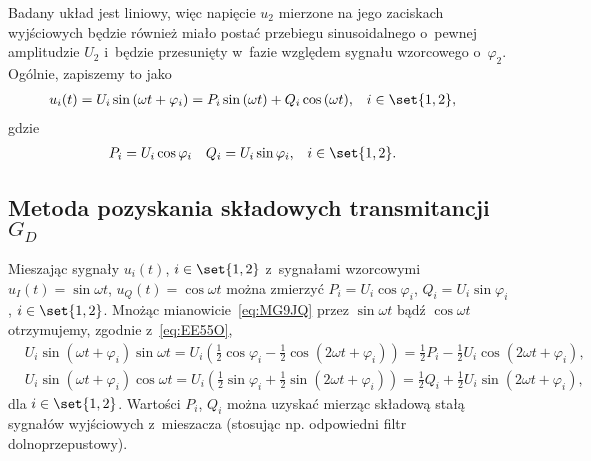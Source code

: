 \documentclass[paper=a4,DIV=12]{tfa}
\begin{document}
Badany układ jest liniowy, więc napięcie $u_2$ mierzone na
jego zaciskach wyjściowych będzie również miało postać przebiegu sinusoidalnego
o~pewnej amplitudzie $U_2$ i~będzie przesunięty w~fazie względem sygnału
wzorcowego o~$\varphi_2$. Ogólnie, zapiszemy to jako
\begin{align}
  & u_i(t) = U_i \sin{(\omega t + \varphi_i)}
         = P_i \sin{(\omega t)} + Q_i \cos{(\omega t)},
  &
  & i \in \set{1, 2}, &
  \label{eq:MG9JQ}
\end{align}
gdzie
\begin{align}
  & P_i = U_i \cos{\varphi_i} &
  & Q_i = U_i \sin{\varphi_i}, &
  & i \in \set{1, 2}. &
  \label{eq:9UTG8}
\end{align}

\subsection{Metoda pozyskania składowych transmitancji $G_D$}
\label{sec:TV9TW}

Mieszając sygnały $u_i(t)$, $i \in \set{1, 2}$ z~sygnałami wzorcowymi $u_I(t) =
\sin{\omega t}$, $u_Q(t) = \cos{\omega t}$ można zmierzyć $P_i = U_i
\cos{\varphi_i}$, $Q_i = U_i \sin {\varphi_i}$, $i \in \set{1, 2}$. Mnożąc
mianowicie~\eqref{eq:MG9JQ} przez $\sin{\omega t}$ bądź $\cos{\omega t}$
otrzymujemy, zgodnie z~\eqref{eq:EE55O},
\begin{subequations}
  \begin{align}
    &  U_i \sin{(\omega t + \varphi_i)}\sin{\omega t}
      = U_i \left(
        \frac{1}{2}\cos{\varphi_i} - \frac{1}{2}\cos{(2 \omega t + \varphi_i)}
      \right)
      = \frac{1}{2} P_i -
        \frac{1}{2} U_i \cos{(2 \omega t + \varphi_i)},
    &
    \label{eq:S0V86}
    \\
    & U_i \sin{(\omega t + \varphi_i)}\cos{\omega t}
      = U_i \left(
        \frac{1}{2}\sin{\varphi_i} + \frac{1}{2}\sin{(2 \omega t + \varphi_i)}
      \right)
      = \frac{1}{2} Q_i +
        \frac{1}{2} U_i \sin{(2 \omega t + \varphi_i)},
    &
    \label{eq:IU4JA}
  \end{align}
  \label{eq:M1ICA}
\end{subequations}
dla $i \in \set{1, 2}$. Wartości $P_i$, $Q_i$ można
uzyskać mierząc składową stałą sygnałów wyjściowych z~mieszacza (stosując
np. odpowiedni filtr dolnoprzepustowy).
\end{document}

